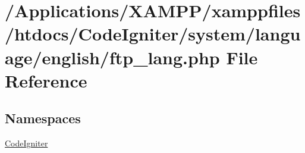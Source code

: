 \hypertarget{ftp__lang_8php}{}\section{/\+Applications/\+X\+A\+M\+P\+P/xamppfiles/htdocs/\+Code\+Igniter/system/language/english/ftp\+\_\+lang.php File Reference}
\label{ftp__lang_8php}
\subsection*{Namespaces}
\begin{DoxyCompactItemize}
\item 
 \mbox{\hyperlink{namespace_code_igniter}{Code\+Igniter}}
\end{DoxyCompactItemize}
